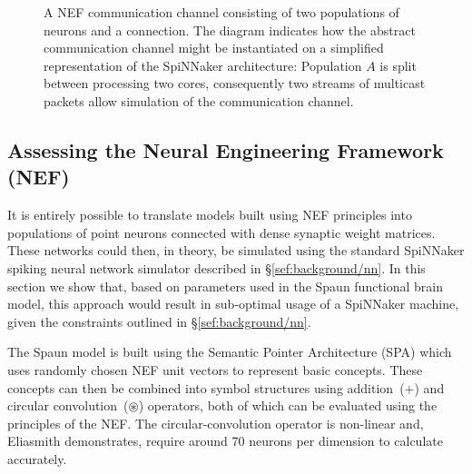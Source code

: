 \documentclass[conference]{IEEEtran}
\begin{document}
  \begin{figure}
    \centering
    
    \caption{A NEF communication channel consisting of two populations of neurons and a connection.
    The diagram indicates how the abstract communication channel might be instantiated on a simplified representation of the SpiNNaker architecture:
    Population $A$ is split between processing two cores, consequently two streams of multicast packets allow simulation of the communication channel.
    }
    \label{fig:background/comms-channel}
  \end{figure}
  
  \subsection{Assessing the Neural Engineering Framework (NEF)}
  \label{sef:background/assessing}

It is entirely possible to translate models built using NEF principles into populations of point neurons connected with dense synaptic weight matrices.
These networks could then, in theory, be simulated using the standard SpiNNaker spiking neural network simulator described in \S\ref{sef:background/nn}.
In this section we show that, based on parameters used in the Spaun functional brain model, this approach would result in sub-optimal usage of a SpiNNaker machine, given the constraints outlined in \S\ref{sef:background/nn}.

The Spaun model is built using the Semantic Pointer Architecture (SPA) \parencite{eliasmith2013build} which uses randomly chosen NEF unit vectors to represent basic concepts.
These concepts can then be combined into symbol structures using addition~($+$) and circular convolution~($\circledast$) operators, both of which can be evaluated using the principles of the NEF.
The circular-convolution operator is non-linear and, Eliasmith \parencite{eliasmith2013build} demonstrates, require around 70 neurons per dimension to calculate accurately.
\end{document}
